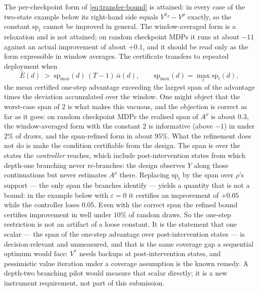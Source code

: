 The per-checkpoint form of \eqref{eq:transfer-bound} is attained: in every
case of the two-state example below its right-hand side equals
$V^{\pi_d}-V^\rho$ exactly, so the constant $\mathrm{sp}_t$ cannot be
improved in general.  The window-averaged form is a relaxation and is not
attained; on random checkpoint MDPs it runs at about $-11$ against an actual
improvement of about $+0.1$, and it should be read only as the form
expressible in window averages.  The certificate transfers to repeated
deployment when
\begin{equation}
 \bar E(d)\;>\;\mathrm{sp}_{\max}(d)\,(T-1)\,\bar\alpha(d),\qquad \mathrm{sp}_{\max}(d)=\max_t\mathrm{sp}_t(d),
 \label{eq:transfer-condition}
\end{equation}
the mean certified one-step advantage exceeding the largest span of the
advantage times the deviation accumulated over the window.  One might object that the
worst-case span of $2$ is what makes this vacuous, and the objection is
correct as far as it goes: on random checkpoint MDPs the realised span of
$A^\rho$ is about $0.3$, the window-averaged form with the constant $2$ is
informative (above $-1$) in under $2\%$ of draws, and the span-refined form
in about $95\%$.  What the refinement does not do is make the condition
certifiable from the design.  The span is over the states the \emph{controller}
reaches, which include post-intervention states from which depth-one branching
never re-branches: the design observes $Y$ along those continuations but never
estimates $A^\rho$ there.  Replacing $\mathrm{sp}_t$ by the span over $\rho$'s
support --- the only span the branches identify --- yields a quantity that is
not a bound: in the example below with $\varepsilon=0$ it certifies an
improvement of $+0.05$ while the controller loses $0.05$.  Even with the
correct span the refined bound certifies improvement in well under $10\%$ of
random draws.  So the one-step restriction is not an artifact of a loose
constant.  It is the statement that one scalar --- the span of the one-step
advantage over post-intervention states --- is decision-relevant and
unmeasured, and that is the same coverage gap a sequential optimum would face:
$V^*$ needs backups at post-intervention states, and pessimistic value
iteration under a coverage assumption is the known remedy.  A depth-two
branching pilot would measure that scalar directly; it is a new instrument
requirement, not part of this submission.

